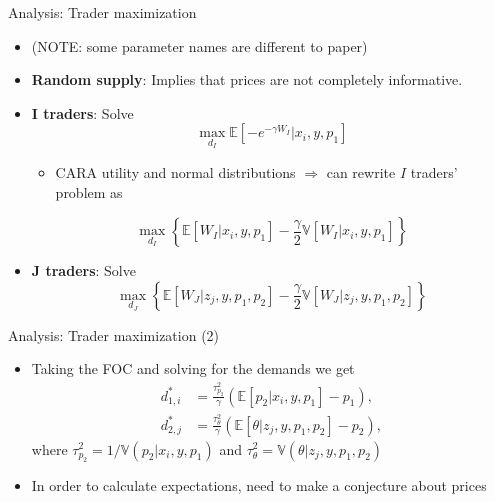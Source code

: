 \documentclass[english,10pt
,aspectratio=169
]{beamer}
\begin{document}
\begin{frame}{Analysis: Trader maximization}
	\begin{itemize}
		\item (NOTE: some parameter names are different to paper)
		\item \textbf{Random supply}: Implies that prices are not completely informative.
		\item \textbf{I traders}: Solve
		\[
			\max_{d_I} \mathbb{E}\left[ -e^{-\gamma W_I}| x_i, y, p_1 \right]
		\]
		\begin{itemize}
			\item CARA utility and normal distributions $\Rightarrow$ can rewrite $I$ traders' problem as
		\end{itemize}
		\[
			\max_{d_I} \left\{\mathbb{E}\left[W_I| x_i, y, p_1\right]-\frac{\gamma}{2} \mathbb{V}\left[W_I| x_i, y, p_1\right]\right\}
		\]
		\item \textbf{J traders}: Solve
		\[
			\max_{d_J} \left\{\mathbb{E}\left[W_J| z_j, y, p_1, p_2\right]-\frac{\gamma}{2} \mathbb{V}\left[W_J| z_j, y, p_1, p_2\right] \right\}
		\]
	\end{itemize}
\end{frame}


\begin{frame}{Analysis: Trader maximization (2)}
	\begin{itemize}
		\item Taking the FOC and solving for the demands we get 
		\begin{align}
			d^*_{1,i} &= \frac{\tau^2_{p_2}}{\gamma}(\mathbb{E}[p_2| x_i, y, p_1]-p_1), \label{eqfoc1} \\
			d^*_{2,j} &= \frac{\tau^2_\theta}{\gamma} (\mathbb{E}[\theta| z_j, y, p_1, p_2]-p_2), \label{eqfoc2}
		\end{align}
		where $\tau^2_{p_2}=1/\mathbb{V}(p_2| x_i, y, p_1)$ and $\tau^2_{\theta}=\mathbb{V}(\theta| z_j, y, p_1, p_2)$
		\item In order to calculate expectations, need to make a conjecture about prices
	\end{itemize}
\end{frame}
\end{document}

